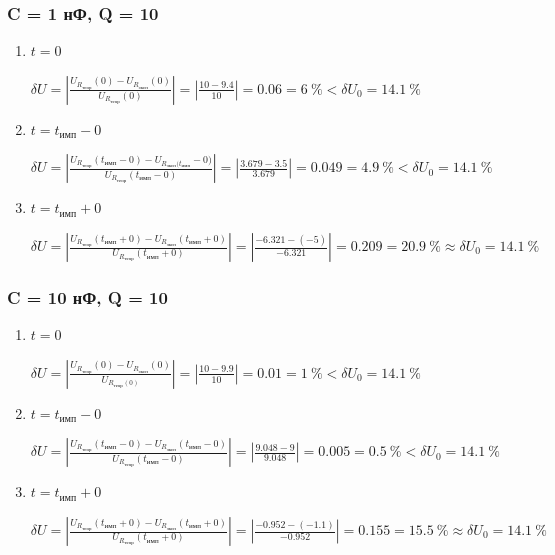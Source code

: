 \subsubsection{C = 1 нФ, Q = 10}

\begin{enumerate}
\item  $t = 0$

	$\delta U = \left| \frac{U_{R_\text{теор}}(0) - U_{R_\text{эксп}}(0)}{U_{R_\text{теор}}(0)} \right| = \left| \frac{10 - 9.4}{10} \right| = 0.06 = 6~\% < \delta U_0 = 14.1~\%$

\item $t = t_\text{имп}-0$

	$\delta U = \left| \frac{U_{R_\text{теор}}(t_\text{имп}-0) - U_{R_\text{эксп}(t_\text{имп}}-0)}{U_{R_\text{теор}}(t_\text{имп}-0)} \right| = \left| \frac{3.679 - 3.5}{3.679} \right| = 0.049 = 4.9~\% < \delta U_0 = 14.1~\%$

\item $t = t_\text{имп}+0$

	$\delta U = \left| \frac{U_{R_\text{теор}}(t_\text{имп}+0) - U_{R_\text{эксп}}(t_\text{имп}+0)}{U_{R_\text{теор}}(t_\text{имп}+0)} \right| = \left| \frac{-6.321 - (-5)}{-6.321} \right| = 0.209 = 20.9~\% \approx \delta U_0 = 14.1~\%$
\end{enumerate}

\subsubsection{C = 10 нФ, Q = 10}

\begin{enumerate}
\item $t = 0$

	$\delta U = \left| \frac{U_{R_\text{теор}}(0) - U_{R_\text{эксп}}(0)}{U_{R_\text{теор}(0)}} \right| = \left| \frac{10 - 9.9}{10} \right| = 0.01 = 1~\% < \delta U_0 = 14.1~\%$

\item $t = t_\text{имп}-0$

	$\delta U = \left| \frac{U_{R_\text{теор}}(t_\text{имп}-0) - U_{R_\text{эксп}}(t_\text{имп}-0)}{U_{R_\text{теор}}(t_\text{имп}-0)} \right| = \left| \frac{9.048 - 9}{9.048} \right| = 0.005 = 0.5~\% < \delta U_0 = 14.1~\%$

\item $t = t_\text{имп}+0$

	$\delta U = \left| \frac{U_{R_\text{теор}}(t_\text{имп}+0) - U_{R_\text{эксп}}(t_\text{имп}+0)}{U_{R_\text{теор}}(t_\text{имп}+0)} \right| = \left| \frac{-0.952 - (-1.1)}{-0.952} \right| = 0.155 = 15.5~\% \approx \delta U_0 = 14.1~\%$
\end{enumerate}


